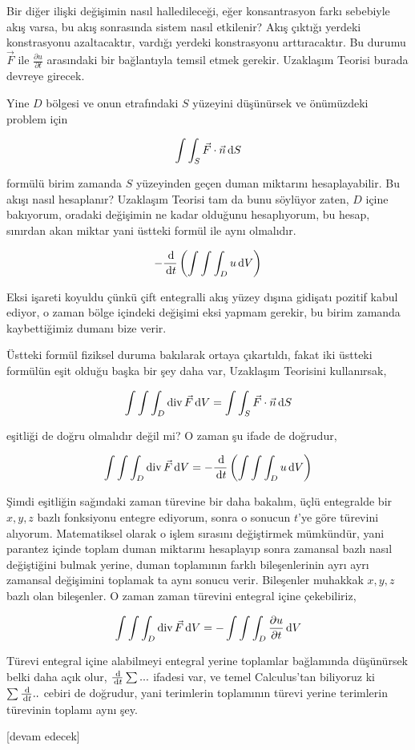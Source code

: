 \documentclass[12pt,fleqn]{article}\usepackage{../../common}
\begin{document}
Bir diğer ilişki değişimin nasıl halledileceği, eğer konsantrasyon farkı
sebebiyle akış varsa, bu akış sonrasında sistem nasıl etkilenir? Akış çıktığı
yerdeki konstrasyonu azaltacaktır, vardığı yerdeki konstrasyonu arttıracaktır.
Bu durumu $\vec{F}$ ile $\frac{\partial u}{\partial t}$ arasındaki bir
bağlantıyla temsil etmek gerekir. Uzaklaşım Teorisi burada devreye girecek.

Yine $D$ bölgesi ve onun etrafındaki $S$ yüzeyini düşünürsek ve önümüzdeki
problem için

$$
\int \int_S \vec{F} \cdot \vec{n} \,\mathrm{d} S
$$

formülü birim zamanda $S$ yüzeyinden geçen duman miktarını hesaplayabilir.  Bu
akışı nasıl hesaplanır? Uzaklaşım Teorisi tam da bunu söylüyor zaten, $D$ içine
bakıyorum, oradaki değişimin ne kadar olduğunu hesaplıyorum, bu hesap, sınırdan
akan miktar yani üstteki formül ile aynı olmalıdır.

$$
- \frac{\,\mathrm{d} }{\,\mathrm{d} t} \left(
\int \int \int_D u \,\mathrm{d} V
\right)
$$

Eksi işareti koyuldu çünkü çift entegralli akış yüzey dışına gidişatı pozitif
kabul ediyor, o zaman bölge içindeki değişimi eksi yapmam gerekir, bu birim
zamanda kaybettiğimiz dumanı bize verir.

Üstteki formül fiziksel duruma bakılarak ortaya çıkartıldı, fakat iki üstteki
formülün eşit olduğu başka bir şey daha var, Uzaklaşım Teorisini kullanırsak,

$$
\int \int \int_D \operatorname{div} \vec{F} \,\mathrm{d} V =
\int \int_S \vec{F} \cdot \vec{n} \,\mathrm{d} S
$$

eşitliği de doğru olmalıdır değil mi? O zaman şu ifade de doğrudur,

$$
\int \int \int_D \operatorname{div} \vec{F} \,\mathrm{d} V =
- \frac{\,\mathrm{d} }{\,\mathrm{d} t} \left( \int \int \int_D u \,\mathrm{d} V \right)
$$

Şimdi eşitliğin sağındaki zaman türevine bir daha bakalım, üçlü entegralde bir
$x,y,z$ bazlı fonksiyonu entegre ediyorum, sonra o sonucun $t$'ye göre türevini
alıyorum. Matematiksel olarak o işlem sırasını değiştirmek mümkündür, yani
parantez içinde toplam duman miktarını hesaplayıp sonra zamansal bazlı nasıl
değiştiğini bulmak yerine, duman toplamının farklı bileşenlerinin ayrı ayrı
zamansal değişimini toplamak ta aynı sonucu verir. Bileşenler muhakkak $x,y,z$
bazlı olan bileşenler. O zaman zaman türevini entegral içine çekebiliriz,

$$
\int \int \int_D \operatorname{div} \vec{F} \,\mathrm{d} V =
- \int \int \int_D \frac{\partial u}{\partial t} \,\mathrm{d} V 
$$

Türevi entegral içine alabilmeyi entegral yerine toplamlar bağlamında düşünürsek
belki daha açık olur, $\frac{\,\mathrm{d}}{\,\mathrm{d} t} \sum ...$ ifadesi var, ve temel
Calculus'tan biliyoruz ki $\sum \frac{\,\mathrm{d}}{\,\mathrm{d} t} .. $ cebiri de doğrudur,
yani terimlerin toplamının türevi yerine terimlerin türevinin toplamı aynı şey.









[devam edecek]
\end{document}
